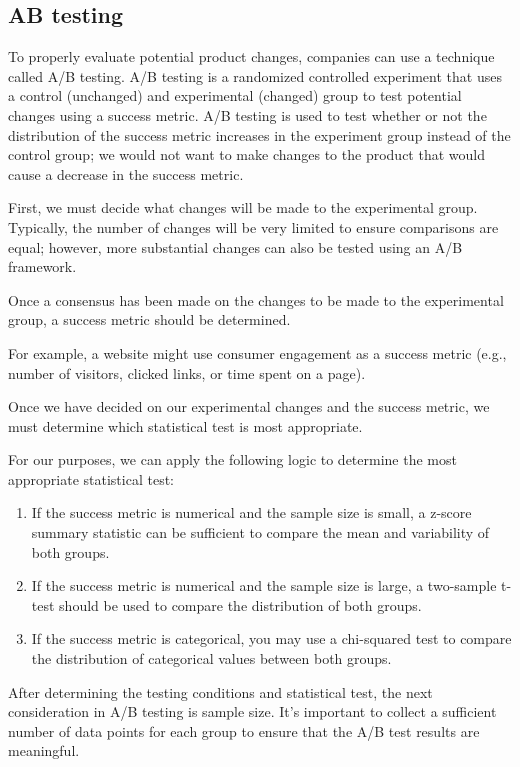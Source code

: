 \documentclass[11pt]{article}
\begin{document}
\subsection{AB testing}
\label{sec:org2d5d12d}

To properly evaluate potential product changes, companies can use a technique called A/B testing. A/B testing is a randomized controlled experiment that uses a control (unchanged) and experimental (changed) group to test potential changes using a success metric. A/B testing is used to test whether or not the distribution of the success metric increases in the experiment group instead of the control group; we would not want to make changes to the product that would cause a decrease in the success metric.

First, we must decide what changes will be made to the experimental group. Typically, the number of changes will be very limited to ensure comparisons are equal; however, more substantial changes can also be tested using an A/B framework.

Once a consensus has been made on the changes to be made to the experimental group, a success metric should be determined.

For example, a website might use consumer engagement as a success metric (e.g., number of visitors, clicked links, or time spent on a page).

Once we have decided on our experimental changes and the success metric, we must determine which statistical test is most appropriate.

For our purposes, we can apply the following logic to determine the most appropriate statistical test:

\begin{enumerate}
\item If the success metric is numerical and the sample size is small, a z-score summary statistic can be sufficient to compare the mean and variability of both groups.
\item If the success metric is numerical and the sample size is large, a two-sample t-test should be used to compare the distribution of both groups.
\item If the success metric is categorical, you may use a chi-squared test to compare the distribution of categorical values between both groups.
\end{enumerate}

After determining the testing conditions and statistical test, the next consideration in A/B testing is sample size. It's important to collect a sufficient number of data points for each group to ensure that the A/B test results are meaningful.
\end{document}
